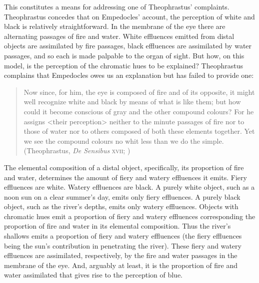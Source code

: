 This constitutes a means for addressing one of Theophrastus' complaints. Theo\-phrastus concedes that on Empedocles' account, the perception of white and black is relatively straightforward. In the membrane of the eye there are alternating passages of fire and water. White effluences emitted from distal objects are assimilated by fire passages, black effluences are assimilated by water passages, and so each is made palpable to the organ of sight. But how, on this model, is the perception of the chromatic hues to be explained? Theophrastus complains that Empedocles owes us an explanation but has failed to provide one:
\begin{quote}
	Now since, for him, the eye is composed of fire and of its opposite, it might well recognize white and black by means of what is like them; but how could it become conscious of gray and the other compound colours? For he assigns <their perception> neither to the minute passages of fire nor to those of water nor to others composed of both these elements together. Yet we see the compound colours no whit less than we do the simple. (Theophrastus, \emph{De Sensibus} \textsc{xvii}; \citealt[81]{Stratton:1917vn})
\end{quote}

The elemental composition of a distal object, specifically, its proportion of fire and water, determines the amount of fiery and watery effluences it emits. Fiery effluences are white. Watery effluences are black. A purely white object, such as a noon sun on a clear summer's day, emits only fiery effluences. A purely black object, such as the river's depths, emits only watery effluences. Objects with chromatic hues emit a proportion of fiery and watery effluences corresponding the proportion of fire and water in its elemental composition. Thus the river's shallows emits a proportion of fiery and watery effluences (the fiery effluences being the sun's contribution in penetrating the river). These fiery and watery effluences are assimilated, respectively, by the fire and water passages in the membrane of the eye. And, arguably at least, it is the proportion of fire and water assimilated that gives rise to the perception of blue. 

